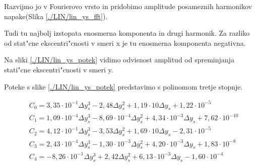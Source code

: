 Razvijmo jo v Fourierovo vrsto in pridobimo amplitude posameznih harmonikov napake(Slika \ref{./LIN/lin_ys_fft}).

Tudi tu najbolj izstopata enosmerna komponenta in drugi harmonik. Za razliko od stat"cne ekscentri"cnosti v smeri x je tu enosmerna komponenta negativna.



Na sliki \ref{./LIN/lin_ys_potek} vidimo odvisnost amplitud od spreminjanja stati"cne ekscentri"cnosti v smeri y.


Poteke s slike \ref{./LIN/lin_ys_potek} predstavimo s polinomom tretje stopnje.

\begin{eqnarray}
&C_0 =3,35\cdot 10^{-1}\Delta y_s^{3}-2,48\Delta y_s^{2}+1,19\cdot 10\Delta y_s+1,22\cdot 10^{-5} \\                   
&C_1 =1,09\cdot 10^{-4}\Delta y_s^{3}-8,69\cdot 10^{-4}\Delta y_s^{2}+4,34\cdot 10^{-3}\Delta y_s+7,62\cdot 10^{-10} \\
&C_2 =4,12\cdot 10^{-1}\Delta y_s^{3}-3,53\Delta y_s^{2}+1,69\cdot 10\Delta y_s-2,31\cdot 10^{-5} \\                   
&C_3 =2,43\cdot 10^{-4}\Delta y_s^{3}-1,30\cdot 10^{-3}\Delta y_s^{2}+4,20\cdot 10^{-3}\Delta y_s+1,83\cdot 10^{-8} \\ 
&C_4 =-8,26\cdot 10^{-1}\Delta y_s^{3}+2,42\Delta y_s^{2}+6,13\cdot 10^{-3}\Delta y_s-1,60\cdot 10^{-4} \\               
\end{eqnarray}




